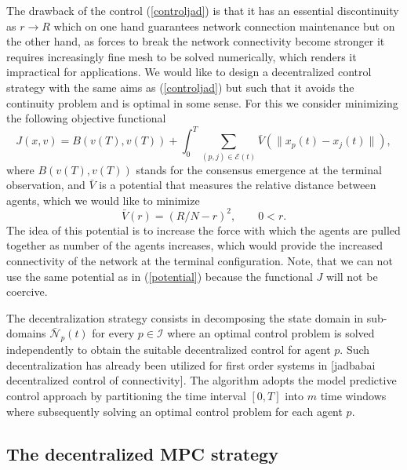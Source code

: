\documentclass[a4paper,10pt, english]{article}
\begin{document}
The drawback of the control (\ref{controljad}) is that it has an essential discontinuity as $r \longrightarrow R$ which on one hand guarantees network connection maintenance but on the other hand, as forces to break the network connectivity become stronger it requires increasingly fine mesh to be solved numerically, which renders it impractical for applications. We would like to design a decentralized control strategy with the same aims as (\ref{controljad}) but such that it avoids the continuity problem and is optimal in some sense. 
For this we consider minimizing the following objective functional 
\begin{equation}
J(x, v) = B(v(T), v(T)) + \int_{0}^{T}\sum_{(p, j)\in \mathcal{E}(t)} \bar{V}(\|x_p(t) - x_j(t)\|),
\label{Vt}
\end{equation}
where $B(v(T), v(T))$ stands for the consensus emergence at the terminal observation, and $\bar{V}$ is a potential that measures the relative distance between agents, which we would like to minimize
\begin{equation}
\bar{V}(r) = (R/N- r)^2, \qquad 0 < r.
\label{potentialbar}
\end{equation}
The idea of this potential is to increase the force with which the agents are pulled together as number of the agents increases, which would provide the increased connectivity of the network at the terminal configuration. Note, that we can not use the same potential as in (\ref{potential}) because the functional $J$ will not be coercive.



The decentralization strategy consists in decomposing the state domain in sub-domains $\bar{\mathcal{N}}_p(t)$ for every $p\in \mathcal{I}$ where an optimal control problem is solved independently to obtain the suitable decentralized control for agent $p$. Such decentralization has already been utilized for first order systems in [jadbabai decentralized control of connectivity].
The algorithm adopts the model predictive control approach by partitioning the time interval $[0, T]$ into $m$ time windows where subsequently solving an optimal control problem for each agent $p$.







 \subsection{The decentralized MPC strategy}
 
\end{document}
